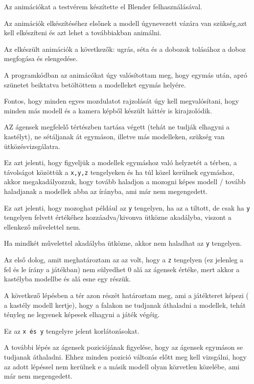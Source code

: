 Az animációkat a testvérem készítette el Blender felhasználásával. 

Az animációk elkészítéséhez elsőnek a modell úgynevezett vázára van szükség,azt kell elkészíteni és azt lehet a továbbiakban animálni. 
 
Az elkészült animációk a következők: ugrás, séta és a dobozok tolásához a doboz megfogása és elengedése.
 
A programkódban az animácókat úgy valósítottam meg, hogy egymás után, apró szünetet beiktatva betöltöttem a modelleket egymás helyére.

Fontos, hogy minden egyes mozdulatot rajzolását úgy kell megvalósítani, hogy minden más modell és a kamera képből készült háttér is kirajzolódik.
 

AZ ágensek megfelelő tértészben tartása végett (tehát ne tudják elhagyni a kastélyt), ne sétáljanak át egymáson, illetve más modelleken, szükség van ütközésvizsgálatra.

Ez azt jelenti, hogy figyeljük a modellek egymáshoz való helyzetét a térben, a távolságot közöttük a \texttt{x,y,z} tengelyeken és ha túl közel kerülnek egymáshoz, akkor megakadályozzuk, hogy tovább haladjon a mozogni képes modell / tovább haladjanak a modellek abba az írányba, ami már nem megengedett.

Ez azt jelenti, hogy  mozoghat  például az \texttt{y} tengelyen, ha az a tiltott, de csak ha \texttt{y} tengelyen felvett értékéhez hozzáadva/kivonva ütközne akadályba, viszont a ellenkező művelettel nem. 

Ha mindkét művelettel akadályba ütközne, akkor nem haladhat az \texttt{y} tengelyen.
 
Az első dolog, amit meghatároztam az az volt, hogy a \texttt{z} tengelyen (ez jelenleg a fel és le írány a játékban) nem sülyedhet 0 alá az ágensek értéke, mert akkor a kastélyba modellbe és alá esne egy részük.

A következő lépésben a tér azon részét határoztam meg, ami a játékteret képezi ( a kastély modell kertje), hogy a falakon ne tudjanak áthaladni a modellek, tehát tényleg ne legyenek képesek elhagyni a játék végéig.

Ez az \texttt{x és y} tengelyre jelent korlátozásokat.

A további lépés az ágensek poziciójának figyelése, hogy az ágensek egymáson se tudjanak áthaladni. Ehhez minden pozició változás előtt meg kell vizsgálni, hogy az adott lépéssel nem kerülnek e a másik modell olyan közvetlen közelébe, ami már nem megengedett.

